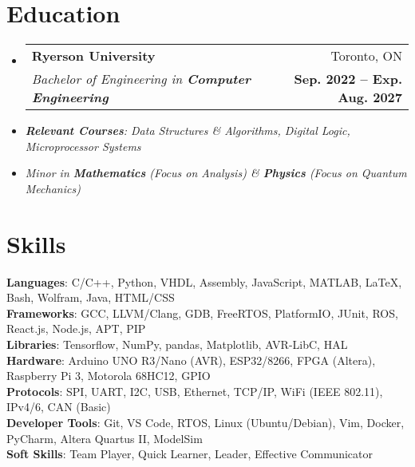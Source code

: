 \documentclass[letterpaper,11pt]{article}
\makeatletter
\newcommand{\resumeItem}[1]{
  \item\small{
    {#1 \vspace{-2pt}}
  }
}
\newcommand{\spaceReducer}{ %
    \vspace{-0.5cm}
}
\newcommand{\spaceReducerMini}{ %
    \vspace{-0.25cm}
}
\newcommand{\resumeSubheading}[4]{
  \vspace{-2pt}\item
    \begin{tabular*}{0.97\textwidth}[t]{l@{\extracolsep{\fill}}r}
      \textbf{#1} & #2 \\
      \textit{\small#3} & {\small#4} \\ %
    \end{tabular*}\vspace{-7pt}
}
\newcommand{\resumeSubHeadingListStart}{\begin{itemize}[leftmargin=0.15in, label={}]}
\newcommand{\resumeSubHeadingListEnd}{\end{itemize}}
\makeatother
\begin{document}
\section{Education}
  \resumeSubHeadingListStart
    \resumeSubheading
      {Ryerson University}{Toronto, ON}
      {Bachelor of Engineering in \textbf{Computer Engineering}}{\textbf{Sep. 2022 -- Exp. Aug. 2027}}
      \vspace{0.05cm}
      \resumeItem{\hspace{0.5cm}\textit{\textbf{Relevant Courses}: Data Structures \& Algorithms, Digital Logic, Microprocessor Systems}}
      \resumeItem{\textit{Minor in \textbf{Mathematics} (Focus on Analysis) \& \textbf{Physics} (Focus on Quantum Mechanics)}}
    \spaceReducerMini
  \resumeSubHeadingListEnd

\section{Skills}
 \begin{itemize}[leftmargin=0.15in, label={}]
    \small{\item{
     \textbf{Languages}{: C/C++, Python, VHDL, Assembly, JavaScript, MATLAB, LaTeX, Bash, Wolfram, Java, HTML/CSS} \\
     \textbf{Frameworks}{: GCC, LLVM/Clang, GDB, FreeRTOS, PlatformIO, JUnit, ROS, React.js, Node.js, APT, PIP} \\
     \textbf{Libraries}{: Tensorflow, NumPy, pandas, Matplotlib, AVR-LibC, HAL} \\
     \textbf{Hardware}{: Arduino UNO R3/Nano (AVR), ESP32/8266, FPGA (Altera), Raspberry Pi 3, Motorola 68HC12, GPIO} \\
     \textbf{Protocols}{: SPI, UART, I2C, USB, Ethernet, TCP/IP, WiFi (IEEE 802.11), IPv4/6, CAN (Basic)} \\
     \textbf{Developer Tools}{: Git, VS Code, RTOS, Linux (Ubuntu/Debian), Vim, Docker, PyCharm, Altera Quartus II, ModelSim} \\
     \textbf{Soft Skills}{: Team Player, Quick Learner, Leader, Effective Communicator} \\
    }}
    \spaceReducerMini
 \end{itemize}
\end{document}
